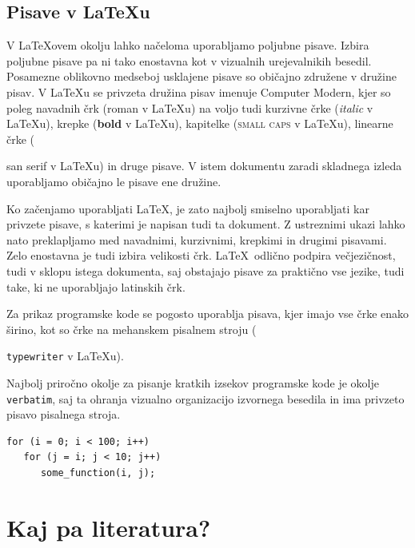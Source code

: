 \documentclass[a4paper, 12pt]{book}
\begin{document}
\section{Pisave v \LaTeX u}

V  \LaTeX ovem okolju lahko načeloma uporabljamo poljubne pisave. 
Izbira poljubne pisave pa ni tako enostavna kot v vizualnih urejevalnikih besedil.
Posamezne oblikovno medseboj usklajene pisave so običajno združene v družine pisav.
V \LaTeX u se privzeta družina pisav imenuje Computer Modern,
kjer so poleg navadnih črk (roman v \LaTeX u) na voljo tudi kurzivne črke (\textit{italic} v \LaTeX u), 
krepke (\textbf{bold} v \LaTeX u), kapitelke (\textsc{small caps} v \LaTeX u), linearne črke ({\textsf{san serif} v \LaTeX u)                                                                                                                                                                                                                                                                                                                         
in druge pisave.
V istem dokumentu zaradi skladnega izleda uporabljamo običajno le pisave ene družine. 

Ko začenjamo uporabljati \LaTeX, je zato najbolj smiselno uporabljati kar privzete pisave, s katerimi je napisan tudi ta dokument.
Z ustreznimi ukazi  lahko nato preklapljamo med navadnimi, kurzivnimi, krepkimi in drugimi pisavami. 
Zelo enostavna je tudi izbira velikosti črk.
\LaTeX\  odlično podpira večjezičnost, tudi v sklopu istega dokumenta, saj obstajajo pisave za praktično vse jezike, tudi take, ki ne uporabljajo latinskih črk.

Za prikaz programske kode se pogosto uporablja pisava, kjer imajo vse črke enako širino, kot so  črke na mehanskem pisalnem stroju ({\texttt{typewriter} v \LaTeX u).

Najbolj priročno okolje za pisanje kratkih izsekov programske kode je okolje \texttt{verbatim}, saj ta ohranja vizualno organizacijo izvornega besedila in ima privzeto pisavo pisalnega stroja.

\begin{verbatim}
for (i = 0; i < 100; i++)
   for (j = i; j < 10; j++)
      some_function(i, j);
\end{verbatim}


\chapter{Kaj pa literatura?}
\label{lit}

}}
\end{document}
